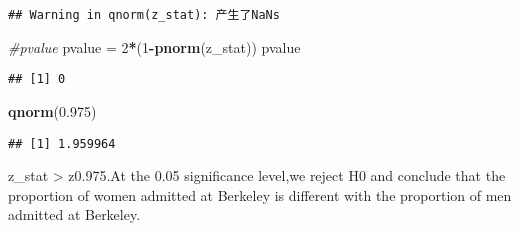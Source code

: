 \documentclass[]{article}
\newenvironment{Shaded}{\begin{snugshade}}{\end{snugshade}}
\newcommand{\KeywordTok}[1]{\textcolor[rgb]{0.13,0.29,0.53}{\textbf{#1}}}
\newcommand{\DecValTok}[1]{\textcolor[rgb]{0.00,0.00,0.81}{#1}}
\newcommand{\FloatTok}[1]{\textcolor[rgb]{0.00,0.00,0.81}{#1}}
\newcommand{\StringTok}[1]{\textcolor[rgb]{0.31,0.60,0.02}{#1}}
\newcommand{\CommentTok}[1]{\textcolor[rgb]{0.56,0.35,0.01}{\textit{#1}}}
\newcommand{\OperatorTok}[1]{\textcolor[rgb]{0.81,0.36,0.00}{\textbf{#1}}}
\newcommand{\NormalTok}[1]{#1}
\begin{document}
\begin{verbatim}
## Warning in qnorm(z_stat): 产生了NaNs
\end{verbatim}

\begin{Shaded}
\begin{Highlighting}[]
\CommentTok{#pvalue}
\NormalTok{  pvalue =}\StringTok{ }\DecValTok{2}\OperatorTok{*}\NormalTok{(}\DecValTok{1}\OperatorTok{-}\KeywordTok{pnorm}\NormalTok{(z_stat))}
\NormalTok{  pvalue}
\end{Highlighting}
\end{Shaded}

\begin{verbatim}
## [1] 0
\end{verbatim}

\begin{Shaded}
\begin{Highlighting}[]
\KeywordTok{qnorm}\NormalTok{(}\FloatTok{0.975}\NormalTok{)}
\end{Highlighting}
\end{Shaded}

\begin{verbatim}
## [1] 1.959964
\end{verbatim}

z\_stat \textgreater{} z0.975.At the 0.05 significance level,we reject
H0 and conclude that the proportion of women admitted at Berkeley is
different with the proportion of men admitted at Berkeley.
\end{document}
